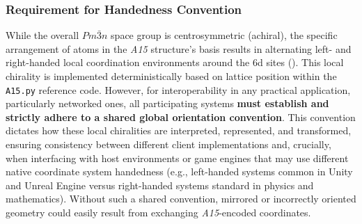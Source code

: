 \documentclass[10pt]{article}
\def\AAAB{\textit{A15}}
\begin{document}
\subsubsection{Requirement for Handedness Convention}\label{subsubsec-limits-handedness}
While the overall $Pm\bar{3}n$ space group is centrosymmetric (achiral), the specific arrangement of atoms in the \AAAB{} structure's basis results in alternating left- and right-handed local coordination environments around the 6d sites (). This local chirality is implemented deterministically based on lattice position within the \texttt{A15.py} reference code. However, for interoperability in any practical application, particularly networked ones, all participating systems \textbf{must establish and strictly adhere to a shared global orientation convention}. This convention dictates how these local chiralities are interpreted, represented, and transformed, ensuring consistency between different client implementations and, crucially, when interfacing with host environments or game engines that may use different native coordinate system handedness (e.g., left-handed systems common in Unity \cite{UnityCoords} and Unreal Engine \cite{UnrealCoords} versus right-handed systems standard in physics and mathematics). Without such a shared convention, mirrored or incorrectly oriented geometry could easily result from exchanging \AAAB{}-encoded coordinates.
\end{document}
